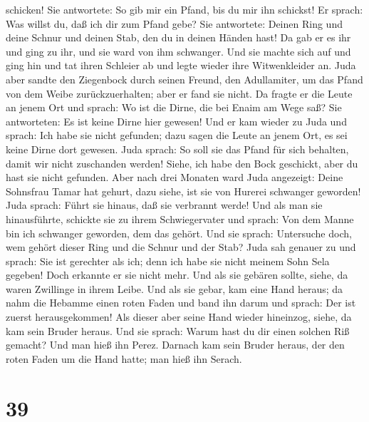 schicken! Sie antwortete: So gib mir ein Pfand, bis du mir ihn schickst!
 Er sprach: Was willst du, daß ich dir zum Pfand gebe?
Sie antwortete: Deinen Ring und deine Schnur und deinen Stab, den du in
deinen Händen hast! Da gab er es ihr und ging zu ihr, und sie ward von
ihm schwanger.  Und sie machte sich auf und ging hin und
tat ihren Schleier ab und legte wieder ihre Witwenkleider an.
 Juda aber sandte den Ziegenbock durch seinen Freund, den
Adullamiter, um das Pfand von dem Weibe zurückzuerhalten; aber er fand
sie nicht.  Da fragte er die Leute an jenem Ort und
sprach: Wo ist die Dirne, die bei Enaim am Wege saß? Sie antworteten: Es
ist keine Dirne hier gewesen!  Und er kam wieder zu Juda
und sprach: Ich habe sie nicht gefunden; dazu sagen die Leute an jenem
Ort, es sei keine Dirne dort gewesen.  Juda sprach: So
soll sie das Pfand für sich behalten, damit wir nicht zuschanden werden!
Siehe, ich habe den Bock geschickt, aber du hast sie nicht gefunden.
 Aber nach drei Monaten ward Juda angezeigt: Deine
Sohnsfrau Tamar hat gehurt, dazu siehe, ist sie von Hurerei schwanger
geworden! Juda sprach: Führt sie hinaus, daß sie verbrannt werde!
 Und als man sie hinausführte, schickte sie zu ihrem
Schwiegervater und sprach: Von dem Manne bin ich schwanger geworden, dem
das gehört. Und sie sprach: Untersuche doch, wem gehört dieser Ring und
die Schnur und der Stab?  Juda sah genauer zu und sprach:
Sie ist gerechter als ich; denn ich habe sie nicht meinem Sohn Sela
gegeben! Doch erkannte er sie nicht mehr.  Und als sie
gebären sollte, siehe, da waren Zwillinge in ihrem Leibe.
 Und als sie gebar, kam eine Hand heraus; da nahm die
Hebamme einen roten Faden und band ihn darum und sprach: Der ist zuerst
herausgekommen!  Als dieser aber seine Hand wieder
hineinzog, siehe, da kam sein Bruder heraus. Und sie sprach: Warum hast
du dir einen solchen Riß gemacht? Und man hieß ihn Perez.
 Darnach kam sein Bruder heraus, der den roten Faden um
die Hand hatte; man hieß ihn Serach.

\hypertarget{section-38}{%
\section{39}\label{section-38}}

